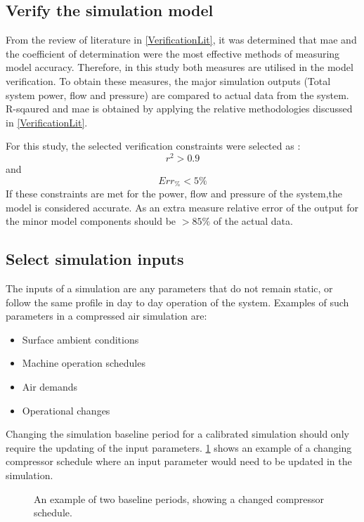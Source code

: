 	\subsection{Verify the simulation model}
	From the review of literature in \cref{VerificationLit}, it was determined that \gls{mae} and the coefficient of determination were the most effective methods of measuring model accuracy. Therefore, in this study both measures are utilised in the model verification. To obtain these measures, the major simulation outputs (Total system power, flow and pressure) are compared to actual data from the system. R-sqaured and \gls{mae} is obtained by applying the relative methodologies discussed in \cref{VerificationLit}.	
	\par 
	For this study, the selected verification constraints were selected as : $$r^2 > 0.9$$ and$$ Err_{\%} < 5\% $$ If these constraints are met for the power, flow and pressure of the system,the model is considered accurate. As an extra measure relative error of the output for the minor model components should be $ > 85\%$ of the actual data. 
		
	\subsection{Select simulation inputs}
		The inputs of a simulation are any parameters that do not remain static, or follow the same profile in day to day operation of the system. Examples of such parameters in a compressed air simulation are:
		\begin{itemize}
			\item Surface ambient conditions
			\item Machine operation schedules
			\item Air demands
			\item Operational changes
		\end{itemize} 
		Changing the simulation baseline period for a calibrated simulation should only require the updating of the input parameters. \cref{fig: Compressor schedule} shows an example of a changing compressor schedule where an input parameter would need to be updated in the simulation.
		\begin{figure}[h]
			\centering
			\fbox{}
			\caption{An example of two baseline periods, showing a changed compressor schedule.}
			\label{fig: Compressor schedule}
		\end{figure}
	
